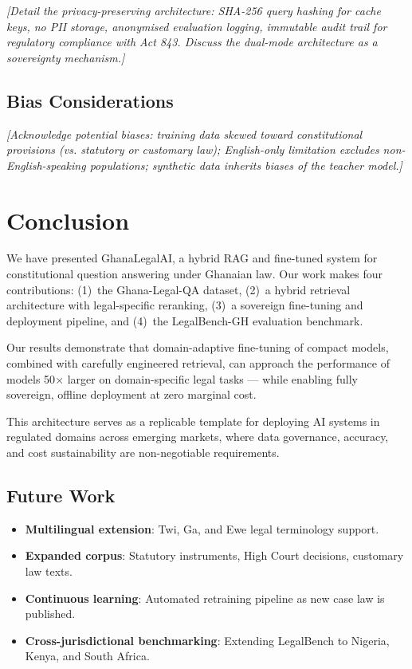 \documentclass[11pt]{article}
\begin{document}
\textit{[Detail the privacy-preserving architecture: SHA-256 query
hashing for cache keys, no PII storage, anonymised evaluation logging,
immutable audit trail for regulatory compliance with Act 843.
Discuss the dual-mode architecture as a sovereignty mechanism.]}

\subsection{Bias Considerations}

\textit{[Acknowledge potential biases: training data skewed toward
constitutional provisions (vs. statutory or customary law);
English-only limitation excludes non-English-speaking populations;
synthetic data inherits biases of the teacher model.]}


\section{Conclusion}
\label{sec:conclusion}

We have presented GhanaLegalAI, a hybrid RAG and fine-tuned system for
constitutional question answering under Ghanaian law. Our work makes
four contributions: (1)~the Ghana-Legal-QA dataset, (2)~a hybrid retrieval
architecture with legal-specific reranking, (3)~a sovereign fine-tuning
and deployment pipeline, and (4)~the LegalBench-GH evaluation benchmark.

Our results demonstrate that domain-adaptive fine-tuning of compact
models, combined with carefully engineered retrieval, can approach the
performance of models 50$\times$ larger on domain-specific legal tasks ---
while enabling fully sovereign, offline deployment at zero marginal cost.

This architecture serves as a replicable template for deploying AI systems
in regulated domains across emerging markets, where data governance,
accuracy, and cost sustainability are non-negotiable requirements.

\subsection{Future Work}

\begin{itemize}
    \item \textbf{Multilingual extension}: Twi, Ga, and Ewe legal
    terminology support.
    \item \textbf{Expanded corpus}: Statutory instruments, High Court
    decisions, customary law texts.
    \item \textbf{Continuous learning}: Automated retraining pipeline
    as new case law is published.
    \item \textbf{Cross-jurisdictional benchmarking}: Extending
    LegalBench to Nigeria, Kenya, and South Africa.
\end{itemize}
\end{document}
